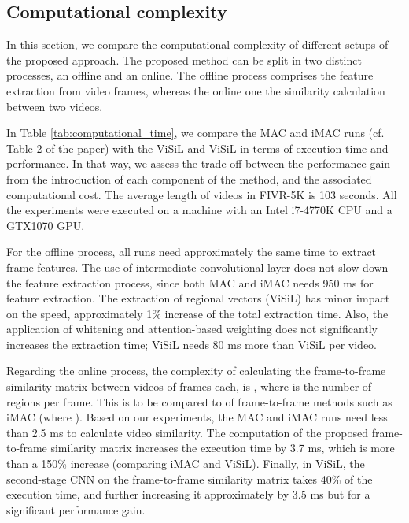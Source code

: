 \documentclass[10pt,twocolumn,letterpaper]{article}
\begin{document}
\subsection{Computational complexity}
In this section, we compare the computational complexity of different setups of the proposed approach. The proposed method can be split in two distinct processes, an offline and an online. The offline process comprises the feature extraction from video frames, whereas the online one the similarity calculation between two videos. 

In Table \ref{tab:computational_time}, we compare the MAC and iMAC runs (cf. Table 2 of the paper) with the ViSiL and ViSiL in terms of execution time and performance. In that way, we assess the trade-off between the performance gain from the introduction of each component of the method, and the associated computational cost. The average length of videos in FIVR-5K is 103 seconds. All the experiments were executed on a machine with an Intel i7-4770K CPU and a GTX1070 GPU.

For the offline process, all runs need approximately the same time to extract frame features. The use of intermediate convolutional layer does not slow down the feature extraction process, since both MAC and iMAC needs 950 ms for feature extraction. The extraction of regional vectors (ViSiL) has minor impact on the speed, approximately 1\% increase of the total extraction time. Also, the application of whitening and attention-based weighting does not significantly increases the extraction time; ViSiL needs 80 ms more than ViSiL per video.

Regarding the online process, the complexity of calculating the frame-to-frame similarity matrix between videos of  frames each, is , where  is the number of regions per frame. This is to be compared to  of frame-to-frame methods such as iMAC (where ). Based on our experiments, the MAC and iMAC runs need less than 2.5 ms to calculate video similarity. The computation of the proposed frame-to-frame similarity matrix increases the execution time by 3.7 ms, which is more than a 150\% increase (comparing iMAC and ViSiL). Finally, in ViSiL, the second-stage CNN on the frame-to-frame similarity matrix takes 40\% of the execution time, and further increasing it approximately by 3.5 ms but for a significant performance gain. 
\end{document}
